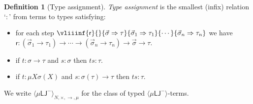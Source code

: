 \documentclass[10pt,a4paper]{amsart}
\theoremstyle{plain}
\newtheorem{proposition}[proposition]{Proposition}
\theoremstyle{definition}
\newtheorem{definition}[definition]{Definition}
\newcommand{\red}[1]{{\color{red}#1}}
\newcommand{\anupam}[1]{\todo[color=green]{A: #1}}
\renewcommand{\todo}[1]{}
\renewcommand{\anupam}[1]{}
\theoremstyle{plain}
\theoremstyle{definition} %
\newcommand{\closure}[1]{\langle #1 \rangle}
\newcommand{\clomuLJneg}{\closure{\muLJneg}}
\newcommand{\typedclomuLJneg}{\clomuLJneg_{\N,\times,\arrow,\mu}}
\newcommand{\nat}{\mathit{N}}
\newcommand{\N}{\nat} %
\newcommand{\arrow}{\to}
\newcommand{\seqar}{\Rightarrow}
\newcommand{\iter}[1]{\mathsf{iter}_{#1}}
\newcommand{\infrule}{\mathsf{r}}
\newcommand{\rrule}{\infrule} %
\newcommand{\lr}[1]{#1_l}
\newcommand{\LJ}{\mathsf{LJ}}
\newcommand{\muLJ}{\mu\LJ}
\newcommand{\muLJneg}{\muLJ^-}
\newcommand{\rewrite}{\rightsquigarrow}
\newcommand{\reduction}{\mathrm{r}}
\newcommand{\reduces}{\rewrite_{\reduction}}
\newcommand{\converts}{=_{\reduction}}
\newcommand{\metader}{\mathcal{D}}
\begin{document}
\begin{definition}
    [Type assignment]
    \emph{Type assignment} is the smallest (infix) relation `$:$' from terms to types satisfying:
    \begin{itemize}
        \item for each step $\vliiinf{\rrule}{}{\vec \sigma \seqar \tau}{\vec \sigma_1\seqar \tau_1}{\cdots}{\vec \sigma_n\seqar \tau_n}$ we have $\rrule : (\vec \sigma_1 \arrow \tau_1) \arrow \cdots \arrow (\vec \sigma_n \arrow \tau_n)\arrow \vec \sigma \arrow \tau$.
        \item if $t:\sigma\arrow \tau$ and $s:\sigma$ then $ts:\tau$.
        \item if $t:\mu X \sigma(X)$ and $s:\sigma(\tau)\arrow \tau$ then $ts:\tau$.
    \end{itemize}
  We write $\typedclomuLJneg$ for the class of typed $\clomuLJneg$-terms.
\end{definition}


\end{document}
